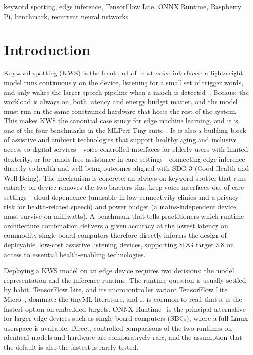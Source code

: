 \documentclass[conference,a4paper]{IEEEtran}
\begin{document}
\begin{IEEEkeywords}
keyword spotting, edge inference, TensorFlow Lite, ONNX Runtime, Raspberry Pi, benchmark, recurrent neural networks
\end{IEEEkeywords}

\section{Introduction}

Keyword spotting (KWS) is the front end of most voice interfaces: a lightweight model runs continuously on the device, listening for a small set of trigger words, and only wakes the larger speech pipeline when a match is detected~\cite{zhang2017helloedge}. Because the workload is always on, both latency and energy budget matter, and the model must run on the same constrained hardware that hosts the rest of the system. This makes KWS the canonical case study for edge machine learning, and it is one of the four benchmarks in the MLPerf Tiny suite~\cite{banbury2021mlperftiny}. It is also a building block of assistive and ambient technologies that support healthy aging and inclusive access to digital services---voice-controlled interfaces for elderly users with limited dexterity, or for hands-free assistance in care settings---connecting edge inference directly to health and well-being outcomes aligned with SDG 3 (Good Health and Well-Being). The mechanism is concrete: an always-on keyword spotter that runs entirely on-device removes the two barriers that keep voice interfaces out of care settings---cloud dependence (unusable in low-connectivity clinics and a privacy risk for health-related speech) and power budget (a mains-independent device must survive on milliwatts). A benchmark that tells practitioners which runtime--architecture combination delivers a given accuracy at the lowest latency on commodity single-board computers therefore directly informs the design of deployable, low-cost assistive listening devices, supporting SDG target 3.8 on access to essential health-enabling technologies.

Deploying a KWS model on an edge device requires two decisions: the model representation and the inference runtime. The runtime question is usually settled by habit. TensorFlow Lite, and its microcontroller variant TensorFlow Lite Micro~\cite{david2021tfmicro}, dominate the tinyML literature, and it is common to read that it is the fastest option on embedded targets. ONNX Runtime~\cite{onnxruntime} is the principal alternative for larger edge devices such as single-board computers (SBCs), where a full Linux userspace is available. Direct, controlled comparisons of the two runtimes on identical models and hardware are comparatively rare, and the assumption that the default is also the fastest is rarely tested.
\end{document}
